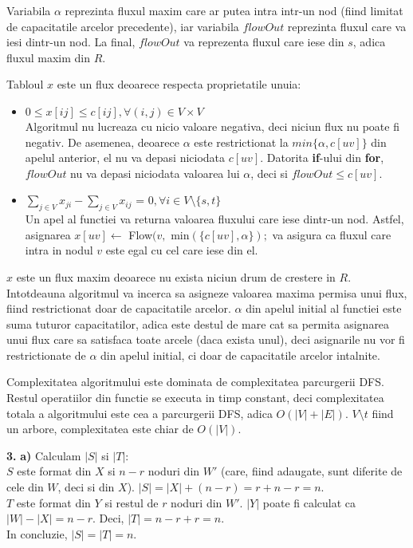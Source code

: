 \documentclass{article}
\begin{document}
Variabila $\alpha$ reprezinta fluxul maxim care ar putea intra intr-un nod (fiind limitat de capacitatile arcelor precedente), iar variabila $flowOut$ reprezinta fluxul care va iesi dintr-un nod. La final, $flowOut$ va reprezenta fluxul care iese din $s$, adica fluxul maxim din $R$. 

Tabloul $x$ este un flux deoarece respecta proprietatile unuia: 
\begin{itemize}
    \item $0 \leq x[ij] \leq c[ij], \forall (i,j) \in V \times V$\\
    Algoritmul nu lucreaza cu nicio valoare negativa, deci niciun flux nu poate fi negativ. De asemenea, deoarece $\alpha$ este restrictionat la $min\{\alpha, c[uv]\}$ din apelul anterior, el nu va depasi niciodata $c[uv]$. Datorita {\bf if}-ului din {\bf for}, $flowOut$ nu va depasi niciodata valoarea lui $\alpha$, deci si $flowOut \leq c[uv]$.
    
    \item $\sum_{j \in V} x_{ji} - \sum_{j \in V} x_{ij}$ = $0, \forall i \in V \setminus \{s,t\}$\\
    Un apel al functiei va returna valoarea fluxului care iese dintr-un nod. Astfel, asignarea $x[uv] \gets$ Flow$(v,$ min$(\{c[uv], \alpha\});$ va asigura ca fluxul care intra in nodul $v$ este egal cu cel care iese din el.
\end{itemize}

$x$ este un flux maxim deoarece nu exista niciun drum de crestere in $R$. Intotdeauna algoritmul va incerca sa asigneze valoarea maxima permisa unui flux, fiind restrictionat doar de capacitatile arcelor. $\alpha$ din apelul initial al functiei este suma tuturor capacitatilor, adica este destul de mare cat sa permita asignarea unui flux care sa satisfaca toate arcele (daca exista unul), deci asignarile nu vor fi restrictionate de $\alpha$ din apelul initial, ci doar de capacitatile arcelor intalnite.

Complexitatea algoritmului este dominata de complexitatea parcurgerii DFS. Restul operatiilor din functie se executa in timp constant, deci complexitatea totala a algoritmului este cea a parcurgerii DFS, adica $O(|V| + |E|)$. $V \setminus t$ fiind un arbore, complexitatea este chiar de $O(|V|)$. 

\vspace{1cm}

{\bf 3.} {\bf a)} Calculam $|S|$ si $|T|$:\\
$S$ este format din $X$ si $n-r$ noduri din $W'$ (care, fiind adaugate, sunt diferite de cele din $W$, deci si din $X$). $|S| = |X| + (n-r) = r + n -r = n$.\\
$T$ este format din $Y$ si restul de $r$ noduri din $W'$. $|Y|$ poate fi calculat ca $|W| - |X| = n-r$. Deci, $|T| = n - r + r = n$.\\
In concluzie, $|S| = |T| = n$.
\end{document}
